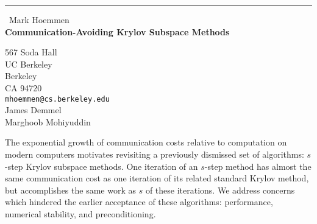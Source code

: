 \documentclass{report}
\begin{document}
\begin{center}
\rule{6in}{1pt} \
{\large Mark Hoemmen \\
{\bf Communication-Avoiding Krylov Subspace Methods}}

567 Soda Hall \\ UC Berkeley \\ Berkeley \\ CA 94720
\\
{\tt mhoemmen@cs.berkeley.edu}\\
James Demmel\\
Marghoob Mohiyuddin\end{center}

The exponential growth of communication costs relative to computation on
modern computers motivates revisiting a previously dismissed set of
algorithms: $s$-step Krylov subspace methods. One iteration of an
$s$-step method has almost the same communication cost as one iteration
of its related standard Krylov method, but accomplishes the same work as
$s$ of these iterations. We address concerns which hindered the earlier
acceptance of these algorithms: performance, numerical stability, and
preconditioning.
\end{document}
